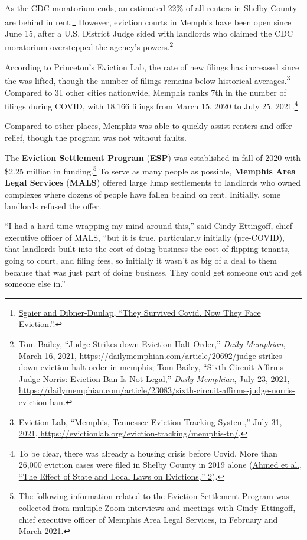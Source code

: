 \documentclass[
  openany]{book}
\begin{document}
As the CDC moratorium ends, an estimated 22\% of all renters in Shelby County are behind in rent.\footnote{\protect\hyperlink{ref-sgaier2021}{Sgaier and Dibner-Dunlap, {``They Survived Covid. Now They Face Eviction.''}}.} However, eviction courts in Memphis have been open since June 15, after a U.S. District Judge sided with landlords who claimed the CDC moratorium overstepped the agency's powers.\footnote{\protect\hyperlink{ref-bailey2021}{Tom Bailey, {``Judge Strikes down Eviction Halt Order,''} \emph{Daily Memphian}, March 16, 2021, \url{https://dailymemphian.com/article/20692/judge-strikes-down-eviction-halt-order-in-memphis}}; \protect\hyperlink{ref-bailey2021a}{Tom Bailey, {``Sixth Circuit Affirms Judge Norris: Eviction Ban Is Not Legal,''} \emph{Daily Memphian}, July 23, 2021, \url{https://dailymemphian.com/article/23083/sixth-circuit-affirms-judge-norris-eviction-ban}}.}

According to Princeton's Eviction Lab, the rate of new filings has increased since the was lifted, though the number of filings remains below historical averages.\footnote{\protect\hyperlink{ref-evictionlab2021}{Eviction Lab, {``Memphis, Tennessee \textbar{} Eviction Tracking System,''} July 31, 2021, \url{https://evictionlab.org/eviction-tracking/memphis-tn/}}.} Compared to 31 other cities nationwide, Memphis ranks 7th in the number of filings during COVID, with 18,166 filings from March 15, 2020 to July 25, 2021.\footnote{To be clear, there was already a housing crisis before Covid. More than 26,000 eviction cases were filed in Shelby County in 2019 alone (\protect\hyperlink{ref-ahmed2021}{Ahmed et al., {``The Effect of State and Local Laws on Evictions,''} 2}).}

Compared to other places, Memphis was able to quickly assist renters and offer relief, though the program was not without faults.

The \textbf{Eviction Settlement Program} (\textbf{ESP}) was established in fall of 2020 with \$2.25 million in funding.\footnote{The following information related to the Eviction Settlement Program was collected from multiple Zoom interviews and meetings with Cindy Ettingoff, chief executive officer of Memphis Area Legal Services, in February and March 2021.} To serve as many people as possible, \textbf{Memphis Area Legal Services} (\textbf{MALS}) offered large lump settlements to landlords who owned complexes where dozens of people have fallen behind on rent. Initially, some landlords refused the offer.

``I had a hard time wrapping my mind around this,'' said Cindy Ettingoff, chief executive officer of MALS, ``but it is true, particularly initially (pre-COVID), that landlords built into the cost of doing business the cost of flipping tenants, going to court, and filing fees, so initially it wasn't as big of a deal to them because that was just part of doing business. They could get someone out and get someone else in.''
\end{document}
